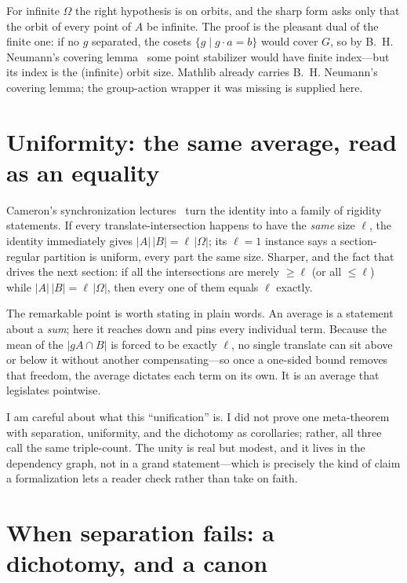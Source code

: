 \documentclass[11pt]{article}
\begin{document}
For infinite $\Omega$ the right hypothesis is on orbits, and the sharp form asks
only that the orbit of every point of $A$ be infinite. The proof is the pleasant
dual of the finite one: if no $g$ separated, the cosets $\{g\mid g\cdot a=b\}$
would cover $G$, so by B.~H. Neumann's covering lemma~\cite{BHNeumann1954} some point stabilizer would
have finite index---but its index is the (infinite) orbit size. Mathlib already
carries B.~H. Neumann's covering lemma; the group-action wrapper it was missing is
supplied here.

\section{Uniformity: the same average, read as an equality}
\label{sec:engine}

Cameron's synchronization lectures~\cite{CameronSync} turn the identity into a family of rigidity
statements. If every translate-intersection happens to have the \emph{same} size
$\ell$, the identity immediately gives $|A|\,|B|=\ell\,|\Omega|$; its $\ell=1$
instance says a section-regular partition is uniform, every part the same size.
Sharper, and the fact that drives the next section: if all the intersections are
merely $\ge\ell$ (or all $\le\ell$) while $|A|\,|B|=\ell\,|\Omega|$, then every
one of them equals $\ell$ exactly.

The remarkable point is worth stating in plain words. An average is a statement
about a \emph{sum}; here it reaches down and pins every individual term. Because
the mean of the $|gA\cap B|$ is forced to be exactly $\ell$, no single translate
can sit above or below it without another compensating---so once a one-sided
bound removes that freedom, the average dictates each term on its own. It is an
average that legislates pointwise.

I am careful about what this ``unification'' is. I did not prove one meta-theorem
with separation, uniformity, and the dichotomy as corollaries; rather, all three
call the same triple-count. The unity is real but modest, and it lives in the
dependency graph, not in a grand statement---which is precisely the kind of claim
a formalization lets a reader check rather than take on faith.

\section{When separation fails: a dichotomy, and a canon}
\label{sec:dichotomy}
\end{document}
